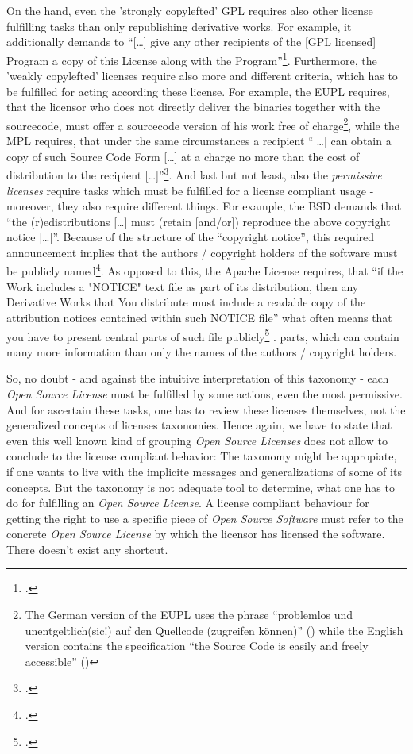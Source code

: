 On the hand, even the 'strongly copylefted' GPL requires also other license
fulfilling tasks than only republishing derivative works. For example, it
additionally demands to \enquote{[\ldots] give any other recipients of the [GPL
licensed] Program a copy of this License along with the
Program}\footcite[cf.][\nopage wp §1]{Gpl20OsiLicense1991a}. Furthermore, the
'weakly copylefted' licenses require also more and different criteria, which has
to be fulfilled for acting according these license. For example, the EUPL
requires, that the licensor who does not directly deliver the binaries together
with the sourcecode, must offer a sourcecode version of his work free of
charge\footnote{The German version of the EUPL uses the phrase
\enquote{problemlos und unentgeltlich(sic!) auf den Quellcode (zugreifen
können)} (\cite[cf.][3, section 3]{EuplLicense2007de}) while the English version
contains the specification \enquote{the Source Code is easily and freely
accessible} (\cite[cf.][2, section 3]{EuplLicense2007en})}, while the MPL
requires, that under the same circumstances a recipient \enquote{[\ldots] can
obtain a copy of such Source Code Form [\ldots] at a charge no more than the
cost of distribution to the recipient [\ldots]}\footcite[cf.][\nopage section
3.2.a]{Mpl20OsiLicense2013a}. And last but not least, also the \emph{permissive
licenses} require tasks which must be fulfilled for a license compliant usage -
moreover, they also require different things. For example, the BSD demands that
\enquote{the (r)edistributions [\ldots] must (retain [and/or]) reproduce the
above copyright notice [\ldots]}. Because of the structure of the
\enquote{copyright notice}, this required announcement implies that the authors
/ copyright holders of the software must be publicly named\footcite[cf.][\nopage
wp]{BsdLicense2Clause}. As opposed to this, the Apache License requires, that
\enquote{if the Work includes a "NOTICE" text file as part of its distribution,
then any Derivative Works that You distribute must include a readable copy of
the attribution notices contained within such NOTICE file} what often means that
you have to present central parts of such file publicly\footcite[cf.][\nopage
wp. section 4.4]{Apl20OsiLicense2004a} . parts, which can contain many more
information than only the names of the authors / copyright holders.

So, no doubt - and against the intuitive interpretation of this taxonomy - each
\emph{Open Source License} must be fulfilled by some actions, even the most
permissive. And for ascertain these tasks, one has to review these licenses
themselves, not the generalized concepts of licenses taxonomies. Hence again, we
have to state that even this well known kind of grouping \emph{Open Source
Licenses} does not allow to conclude to the license compliant behavior: The
taxonomy might be appropiate, if one wants to live with the implicite messages
and generalizations of some of its concepts. But the taxonomy is not adequate
tool to determine, what one has to do for fulfilling an \emph{Open Source
License}. A license compliant behaviour for getting the right to use a specific
piece of \emph{Open Source Software} must refer to the concrete \emph{Open
Source License} by which the licensor has licensed the software. There doesn't
exist any shortcut.

